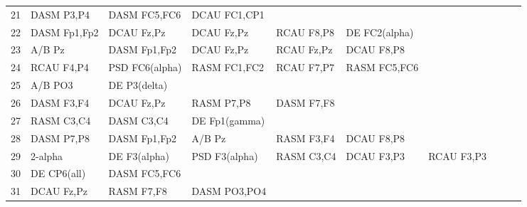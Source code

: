 \begin{landscape}
\begin{table}[]
\begin{tabular}{l|llllllll}
21       & DASM P3,P4     & DASM FC5,FC6   & DCAU FC1,CP1   &                &                &                &               &                &               &               \\
22       & DASM Fp1,Fp2   & DCAU Fz,Pz     & DCAU Fz,Pz     & RCAU F8,P8     & DE FC2(alpha)  &                &               &                &               &               \\
23       & A/B Pz         & DASM Fp1,Fp2   & DCAU Fz,Pz     & RCAU Fz,Pz     & DCAU F8,P8     &                &               &                &               &               \\
24       & RCAU F4,P4     & PSD FC6(alpha) & RASM FC1,FC2   & RCAU F7,P7     & RASM FC5,FC6   &                &               &                &               &               \\
25       & A/B PO3        & DE P3(delta)   &                &                &                &                &               &                &               &               \\
26       & DASM F3,F4     & DCAU Fz,Pz     & RASM P7,P8     & DASM F7,F8     &                &                &               &                &               &               \\
27       & RASM C3,C4     & DASM C3,C4     & DE Fp1(gamma)  &                &                &                &               &                &               &               \\
28       & DASM P7,P8     & DASM Fp1,Fp2   & A/B Pz         & RASM F3,F4     & DCAU F8,P8     &                &               &                &               &               \\
29       & 2-alpha        & DE F3(alpha)   & PSD F3(alpha)  & RASM C3,C4     & DCAU F3,P3     & RCAU F3,P3     &               &                &               &               \\
30       & DE CP6(all)    & DASM FC5,FC6   &                &                &                &                &               &                &               &               \\
31       & DCAU Fz,Pz     & RASM F7,F8     & DASM PO3,PO4   &                &                &                &               &                &               &               \\
\end{tabular}
\end{table}
\end{landscape}
\clearpage
